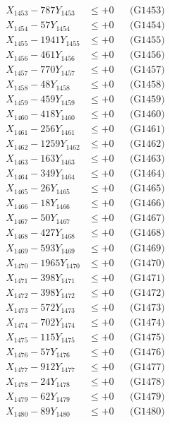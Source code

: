 \documentclass[a4paper,10pt]{article}
\begin{document}
{\begin{align}
X_{1453} - 787Y_{1453} &\leq +0 && \text{(G1453)} \\
X_{1454} - 57Y_{1454} &\leq +0 && \text{(G1454)} \\
X_{1455} - 1941Y_{1455} &\leq +0 && \text{(G1455)} \\
X_{1456} - 461Y_{1456} &\leq +0 && \text{(G1456)} \\
X_{1457} - 770Y_{1457} &\leq +0 && \text{(G1457)} \\
X_{1458} - 48Y_{1458} &\leq +0 && \text{(G1458)} \\
X_{1459} - 459Y_{1459} &\leq +0 && \text{(G1459)} \\
X_{1460} - 418Y_{1460} &\leq +0 && \text{(G1460)} \\
\allowbreak
X_{1461} - 256Y_{1461} &\leq +0 && \text{(G1461)} \\
X_{1462} - 1259Y_{1462} &\leq +0 && \text{(G1462)} \\
X_{1463} - 163Y_{1463} &\leq +0 && \text{(G1463)} \\
X_{1464} - 349Y_{1464} &\leq +0 && \text{(G1464)} \\
X_{1465} - 26Y_{1465} &\leq +0 && \text{(G1465)} \\
X_{1466} - 18Y_{1466} &\leq +0 && \text{(G1466)} \\
X_{1467} - 50Y_{1467} &\leq +0 && \text{(G1467)} \\
X_{1468} - 427Y_{1468} &\leq +0 && \text{(G1468)} \\
X_{1469} - 593Y_{1469} &\leq +0 && \text{(G1469)} \\
X_{1470} - 1965Y_{1470} &\leq +0 && \text{(G1470)} \\
\allowbreak
X_{1471} - 398Y_{1471} &\leq +0 && \text{(G1471)} \\
X_{1472} - 398Y_{1472} &\leq +0 && \text{(G1472)} \\
X_{1473} - 572Y_{1473} &\leq +0 && \text{(G1473)} \\
X_{1474} - 702Y_{1474} &\leq +0 && \text{(G1474)} \\
X_{1475} - 115Y_{1475} &\leq +0 && \text{(G1475)} \\
X_{1476} - 57Y_{1476} &\leq +0 && \text{(G1476)} \\
X_{1477} - 912Y_{1477} &\leq +0 && \text{(G1477)} \\
X_{1478} - 24Y_{1478} &\leq +0 && \text{(G1478)} \\
X_{1479} - 62Y_{1479} &\leq +0 && \text{(G1479)} \\
X_{1480} - 89Y_{1480} &\leq +0 && \text{(G1480)} \\

\end{align}}
\end{document}
